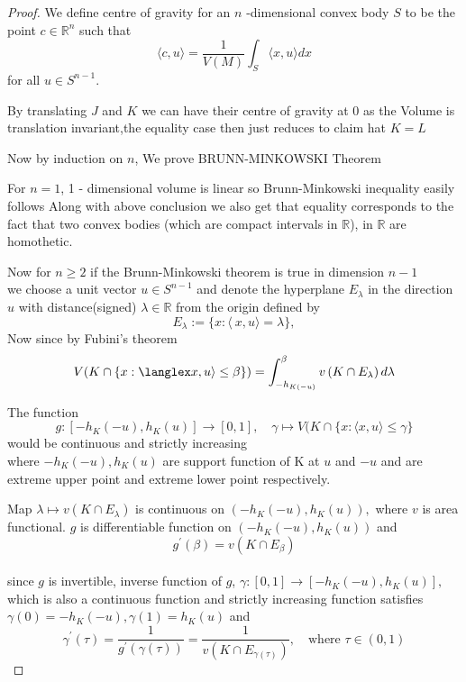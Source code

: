 \documentclass[oneside]{book}
\begin{document}
\begin{proof}
 We define centre of gravity for an $n$ -dimensional convex body $S$ to be the point $c \in \mathbb{R}^{n}$ such that
\[
\langle c, u\rangle=\frac{1}{V(M)} \int_{S}\langle x, u\rangle d x
\]
for all $u \in S^{n-1} .$ \newpage

By translating  $J$ and $K$ we can have their centre of gravity at 0 as the Volume is translation invariant,the equality case then just reduces to claim hat $K=L$
\hfill \break

Now by induction on $n$, We prove  BRUNN-MINKOWSKI Theorem 

\hfill \break
For $n=1$, 1 - dimensional volume is linear so Brunn-Minkowski inequality easily follows 
\hfill \break 
Along with above conclusion we also get that equality corresponds to the fact that two convex bodies (which are compact intervals in $\mathbb{R}$), in $\mathbb{R}$  are homothetic.
\hfill \break 

Now for $n \geq 2$ if the Brunn-Minkowski theorem is true in dimension $n-1 $
\\
we choose a unit vector $u \in S^{n-1}$ and denote 
the hyperplane $E_{\lambda}$ in the direction $u$ with  distance(signed) $\lambda \in \mathbb{R} $ from the origin defined by 
\[
E_{\lambda}:=\{x:\langle\ x, u\rangle=\lambda\}, 
\]
Now since by Fubini's theorem  
\[
V(K \cap\{x: \langlex x, u\rangle \leq \beta\})=\int_{-h_{ K(-u)}}^{\beta} v\left(K \cap E_{\lambda}\right) d \lambda
\] 


The function
\[
g:\left[-h_{K}(-u), h_{K}(u)\right] \rightarrow[0,1], \quad \gamma \mapsto V(K \cap\{x:\langle x, u\rangle \leq  \gamma \}
\]
would be  continuous and strictly increasing\\
where $-h_{K}(-u), h_{K}(u)$ are support function of K at $u$ and $-u$ and are extreme upper point and extreme lower point respectively.
\hfill \break


  Map $\lambda \mapsto v\left(K \cap E_{\lambda}\right)$ is continuous on $\left(-h_{K}(-u), h_{K}(u)\right),$ where $v$ is area functional.
   $g$ is differentiable function on $\left(-h_{K}(-u), h_{K}(u)\right)$ and $$g^{\prime}(\beta)=v\left(K \cap E_{\beta}\right)$$
  \\
  since $g$ is invertible, inverse function of $g$, $ \gamma:[0,1] \rightarrow\left[-h_{K}(-u), h_{K}(u)\right],$ which is also a continuous function and strictly increasing  function satisfies $ \gamma(0)=-h_{K}(-u),  \gamma(1)=h_{K}(u)$ and
\[
 \gamma^{\prime}(\tau)=\frac{1}{g^{\prime}( \gamma(\tau))}=\frac{1}{v\left(K \cap E_{ \gamma(\tau)}\right)}, \quad  \text{where } \tau \in(0,1)
\]






\end{proof}
\end{document}
